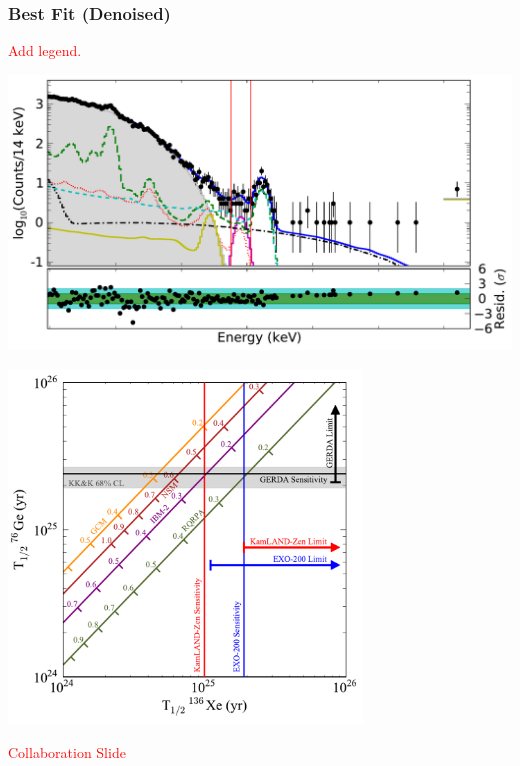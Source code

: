 \documentclass{beamer}
\begin{document}
\begin{frame}
\begin{center}
\frametitle{Best Fit (Denoised)}
\end{center}
\vspace{0.6cm}
\textcolor{red}{Add legend.}
\begin{center}
\includegraphics[keepaspectratio=true,width=\textwidth]{Energy_BestFit.pdf}
\end{center}
\end{frame}

\begin{frame}
\begin{center}
\includegraphics[keepaspectratio=true,width=3.7in]{MatplotLibSensitivity.pdf}
\end{center}
\end{frame}

\begin{frame}
\textcolor{red}{Collaboration Slide}
\end{frame}
\end{document}
